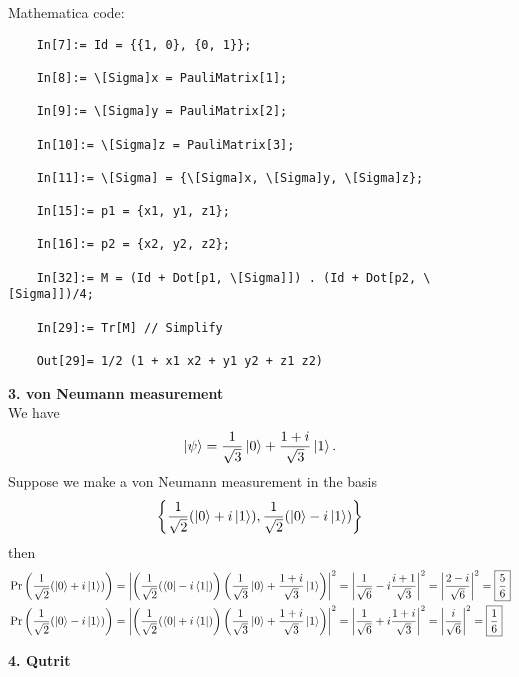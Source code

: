 \documentclass{article}
\theoremstyle{definition}
\newcommand{\f}[2]{\frac{#1}{#2}}
\newcommand{\lp}{\left(}
\newcommand{\rp}{\right)}
\newcommand{\lc}{\left\{}
\newcommand{\rc}{\right\}}
\begin{document}
\begin{enumerate}[label=(\alph*)]
	
	
	


Mathematica code:
\begin{lstlisting}
	In[7]:= Id = {{1, 0}, {0, 1}};
	
	In[8]:= \[Sigma]x = PauliMatrix[1];
	
	In[9]:= \[Sigma]y = PauliMatrix[2];
	
	In[10]:= \[Sigma]z = PauliMatrix[3];
	
	In[11]:= \[Sigma] = {\[Sigma]x, \[Sigma]y, \[Sigma]z};
	
	In[15]:= p1 = {x1, y1, z1};
	
	In[16]:= p2 = {x2, y2, z2};
	
	In[32]:= M = (Id + Dot[p1, \[Sigma]]) . (Id + Dot[p2, \[Sigma]])/4;
	
	In[29]:= Tr[M] // Simplify
	
	Out[29]= 1/2 (1 + x1 x2 + y1 y2 + z1 z2)
\end{lstlisting}
\end{enumerate}


\noindent \textbf{3. \textbf{von Neumann measurement}}\\

We have 
\begin{align*}
	\ket{\psi} = \f{1}{\sqrt{3}} \ket{0} + \f{1+i}{\sqrt{3}} \ket{1}.
\end{align*} 
Suppose we make a von Neumann measurement in the basis 
\begin{align*}
	\lc \f{1}{\sqrt{2}} (\ket{0} + i\ket{1}), \f{1}{\sqrt{2}} (\ket{0} - i\ket{1})     \rc
\end{align*}
then
\begin{align*}
	&\Pr\lp  \f{1}{\sqrt{2}} (\ket{0} + i\ket{1}) \rp = \abs{\lp \f{1}{\sqrt{2}} (\bra{0} - i\bra{1}) \rp \lp \f{1}{\sqrt{3}} \ket{0} + \f{1+i}{\sqrt{3}} \ket{1} \rp }^2 = \abs{\f{1}{\sqrt{6}} - i \f{i+1}{\sqrt{3}}}^2 = \abs{\f{2-i}{\sqrt{6}}}^2 = \boxed{\f{5}{6}}\\
	&\Pr\lp \f{1}{\sqrt{2}} (\ket{0} - i\ket{1})  \rp = \abs{\lp \f{1}{\sqrt{2}} (\bra{0} + i\bra{1}) \rp\lp \f{1}{\sqrt{3}} \ket{0} + \f{1+i}{\sqrt{3}} \ket{1} \rp}^2 = \abs{\f{1}{\sqrt{6}} + i \f{1+i}{\sqrt{3}}}^2 = \abs{\f{i}{\sqrt{6}}}^2 = \boxed{\f{1}{6}} 
\end{align*}




\noindent \textbf{4. Qutrit}
\end{document}
